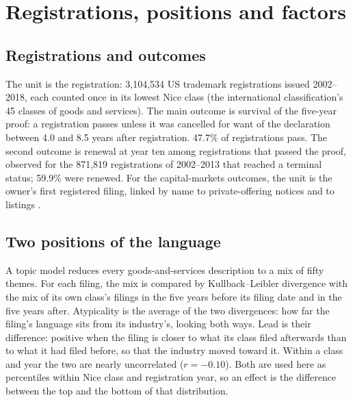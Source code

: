 
\usepackage{longtable}
\usepackage{array}
\usepackage{placeins}
\graphicspath{{../../}}
\makeatletter{}\makeatother


\section{Registrations, positions and factors}\label{sec:data}

\subsection{Registrations and outcomes}

The unit is the registration: 3,104,534 US trademark registrations issued
2002--2018, each counted once in its lowest Nice class (the international
classification's 45 classes of goods and services). The main outcome is
survival of the five-year proof: a registration passes unless it was
cancelled for want of the declaration between 4.0 and 8.5 years after
registration. 47.7\% of registrations pass. The second outcome is
renewal at year ten among registrations that passed the proof, observed
for the 871,819 registrations of 2002--2013 that reached a terminal
status; 59.9\% were renewed. For the capital-markets outcomes, the unit
is the owner's first registered filing, linked by name to private-offering
notices and to listings \citep{SilverCorpus2026}.

\subsection{Two positions of the language}

A topic model reduces every goods-and-services description to a mix of
fifty themes. For each filing, the mix is compared by Kullback--Leibler
divergence with the mix of its own class's filings in the five years
before its filing date and in the five years after. Atypicality is the
average of the two divergences: how far the filing's language sits from
its industry's, looking both ways. Lead is their difference: positive
when the filing is closer to what its class filed afterwards than to
what it had filed before, so that the industry moved toward it. Within a
class and year the two are nearly uncorrelated ($r = -0.10$). Both are
used here as percentiles within Nice class and registration year, so an
effect is the difference between the top and the bottom of that
distribution.

